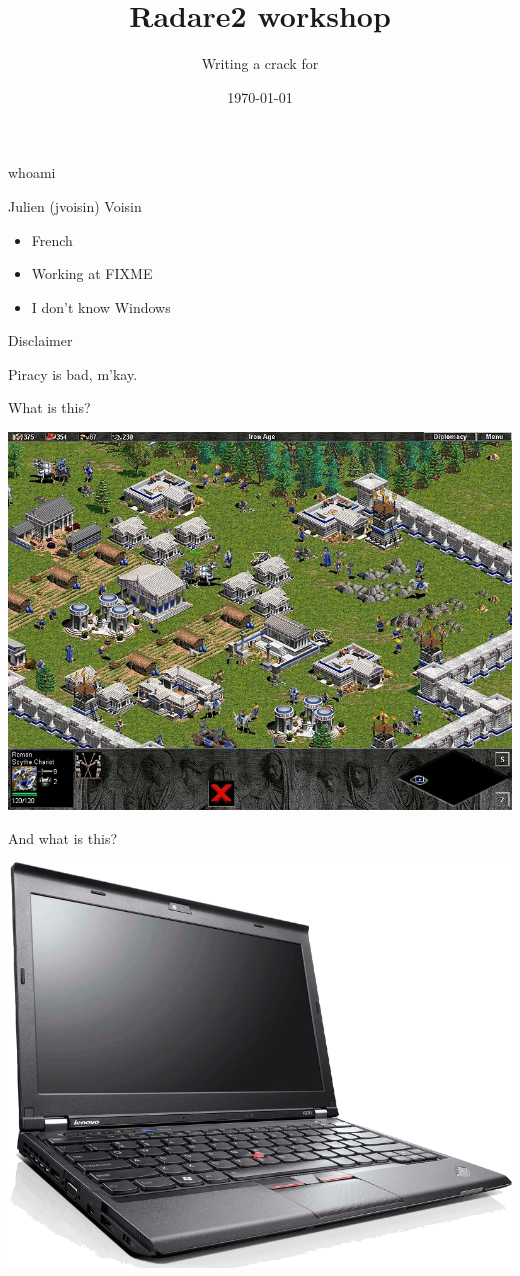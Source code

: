 \documentclass{beamer}
\title{Radare2 workshop}
\author{Writing a crack for \blackout{Age of Empire} }
\date{\today}
\institute{hack.lu 2015}
\begin{document}
\maketitle

\begin{frame}{whoami}
	\begin{block}{Julien (jvoisin) Voisin}
	\begin{itemize}
		\item French
		\item Working at FIXME
		\item I don't know Windows
	\end{itemize}
	\end{block}
\end{frame}

\begin{frame}{Disclaimer}
	\begin{center}
		Piracy is \alert{bad}, m'kay.
	\end{center}
\end{frame}

\begin{frame}{What is this?}
	\begin{center}
		\includegraphics[width=.9\textwidth]{aoe.jpg}
	\end{center}
\end{frame}

\begin{frame}{And what is this?}
	\begin{center}
		\includegraphics[width=.75\textwidth]{x230.png}
	\end{center}
\end{frame}
\end{document}
